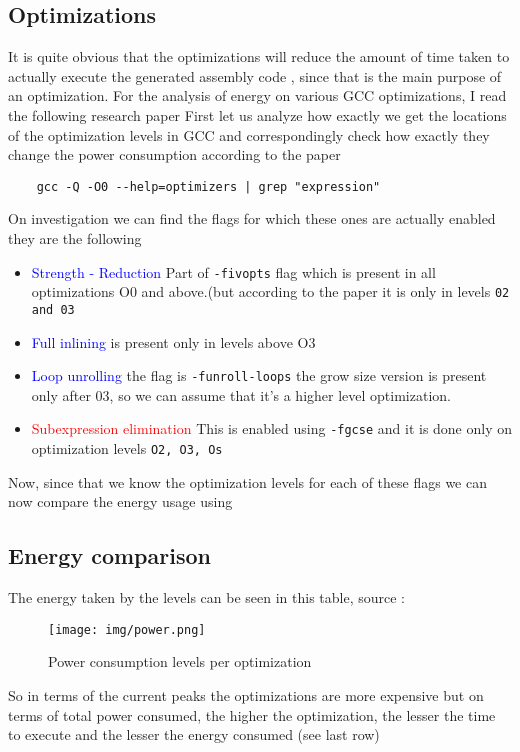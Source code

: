 \documentclass[a4paper, 12pt]{article}
\begin{document}
\subsection{Optimizations}
It is quite obvious that the optimizations will reduce the amount of time taken to actually execute the generated assembly code , since that is the main purpose of an optimization. For the analysis of energy on various GCC optimizations,  I read the following research paper\cite{4786702}
First let us analyze how exactly we get the locations of the optimization levels in GCC
and correspondingly check how exactly they change the power consumption according to the paper
\begin{verbatim}
    gcc -Q -O0 --help=optimizers | grep "expression"
\end{verbatim}
On investigation we can find the flags for which these ones are actually enabled they are the following
\begin{itemize}
    \item \textcolor{blue}{Strength - Reduction} Part of \verb|-fivopts| flag which is present in all optimizations O0 and above.(but according to the paper it is only in levels \verb|02 and 03|
    \item \textcolor{blue}{Full inlining} is present only in levels above O3
    \item \textcolor{blue}{Loop unrolling} the flag is \verb|-funroll-loops| the grow size version is present only after 03, so we can assume that it's a higher level optimization.
    \item \textcolor{red}{Subexpression elimination} This is enabled using \verb|-fgcse| and it is done only on optimization levels \verb|O2, O3, Os|
\end{itemize}
Now, since that we know the optimization levels for each of these flags we can now compare the energy usage using \cite{4786702}

\subsection{Energy comparison}
The energy taken by the levels can be seen in this table, 
source : \cite{4786702}
\begin{figure}[H]
    \centering
    \texttt{[image: img/power.png]}
    \caption{Power consumption levels per optimization}
    \label{fig:my_label}
\end{figure}
So in terms of the current peaks the optimizations are more expensive but on terms of total power consumed, the higher the optimization, the lesser the time to execute and the lesser the energy consumed (see last row)
\end{document}
